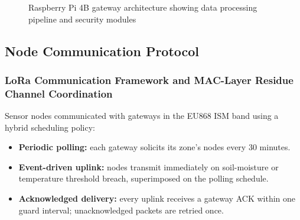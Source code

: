 \documentclass[pdflatex,sn-mathphys-num]{sn-jnl}
\theoremstyle{thmstyleone}
\theoremstyle{thmstyletwo}
\theoremstyle{thmstylethree}
\begin{document}
\begin{figure}
{}%
  \caption{Raspberry Pi 4B gateway architecture showing data processing pipeline and security modules}
  \label{fig:gateway-architecture}
\end{figure}

\subsection{Node Communication Protocol}
\label{subsec:communication_protocol}

\subsubsection{LoRa Communication Framework and MAC-Layer Residue Channel Coordination}
\label{subsubsec:lora_mac}

Sensor nodes communicated with gateways in the EU868 ISM band \cite{ttn2024eu868,loraalliance2021regional} using a hybrid scheduling policy:
\begin{itemize}
  \item \textbf{Periodic polling:} each gateway solicits its zone's nodes every 30 minutes.
  \item \textbf{Event-driven uplink:} nodes transmit immediately on soil-moisture or temperature threshold breach, superimposed on the polling schedule.
  \item \textbf{Acknowledged delivery:} every uplink receives a gateway ACK within one guard interval; unacknowledged packets are retried once.
\end{itemize}
\end{document}
